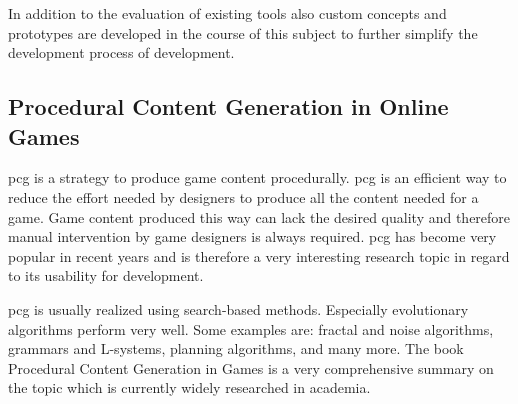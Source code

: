 In addition to the evaluation of existing tools also custom concepts and
prototypes are developed in the course of this subject to further simplify the
development process of \ms{} \og{} development.

\subsection{Procedural Content Generation in Online Games}

 \gls{pcg} is a strategy to produce game content procedurally.
\gls{pcg} is an efficient way to reduce the effort needed by designers to
produce all the content needed for a game. Game content produced this way can
lack the desired quality and therefore manual intervention by game designers is
always required. \gls{pcg} has become very popular in recent years
\cite{lee2014procedural} and is therefore a very interesting research topic in
regard to its usability for \og{} development.

\gls{pcg} is usually realized using search-based methods. Especially evolutionary
algorithms perform very well. Some examples are: fractal and noise algorithms,
grammars and L-systems, planning algorithms, and many more. The book Procedural
Content Generation in Games \cite{shaker2014procedural} is a very comprehensive
summary on the topic which is currently widely researched in academia.

